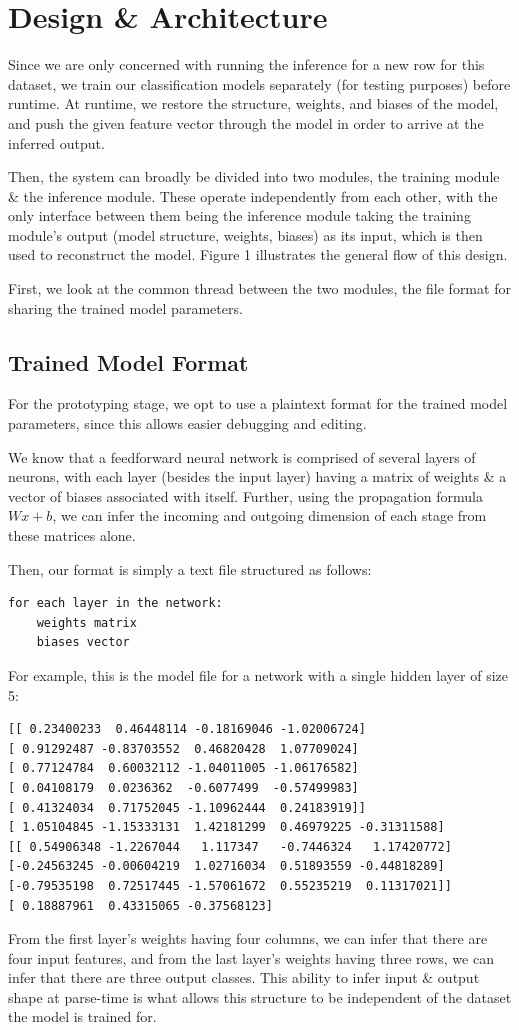 \documentclass[12pt]{article}
\begin{document}
\section{Design \& Architecture}
Since we are only concerned with running the inference for a new row for this dataset, we train our classification models separately (for testing purposes) before runtime. At runtime, we restore the structure, weights, and biases of the model, and push the given feature vector through the model in order to arrive at the inferred output.\bigskip

Then, the system can broadly be divided into two modules, the training module \& the inference module. These operate independently from each other, with the only interface between them being the inference module taking the training module's output (model structure, weights, biases) as its input, which is then used to reconstruct the model. Figure 1 illustrates the general flow of this design.\bigskip

First, we look at the common thread between the two modules, the file format for sharing the trained model parameters.

\subsection{Trained Model Format}
For the prototyping stage, we opt to use a plaintext format for the trained model parameters, since this allows easier debugging and editing.\bigskip

We know that a feedforward neural network is comprised of several layers of neurons, with each layer (besides the input layer) having a matrix of weights \& a vector of biases associated with itself. Further, using the propagation formula $Wx + b$, we can infer the incoming and outgoing dimension of each stage from these matrices alone.\bigskip

Then, our format is simply a text file structured as follows:
\begin{verbatim}
for each layer in the network:
    weights matrix
    biases vector
\end{verbatim}
For example, this is the model file for a network with a single hidden layer of size 5:
\begin{verbatim}
[[ 0.23400233  0.46448114 -0.18169046 -1.02006724]
[ 0.91292487 -0.83703552  0.46820428  1.07709024]
[ 0.77124784  0.60032112 -1.04011005 -1.06176582]
[ 0.04108179  0.0236362  -0.6077499  -0.57499983]
[ 0.41324034  0.71752045 -1.10962444  0.24183919]]
[ 1.05104845 -1.15333131  1.42181299  0.46979225 -0.31311588]
[[ 0.54906348 -1.2267044   1.117347   -0.7446324   1.17420772]
[-0.24563245 -0.00604219  1.02716034  0.51893559 -0.44818289]
[-0.79535198  0.72517445 -1.57061672  0.55235219  0.11317021]]
[ 0.18887961  0.43315065 -0.37568123]   
\end{verbatim}
From the first layer's weights having four columns, we can infer that there are four input features, and from the last layer's weights having three rows, we can infer that there are three output classes. This ability to infer input \& output shape at parse-time is what allows this structure to be independent of the dataset the model is trained for.\bigskip
\end{document}
